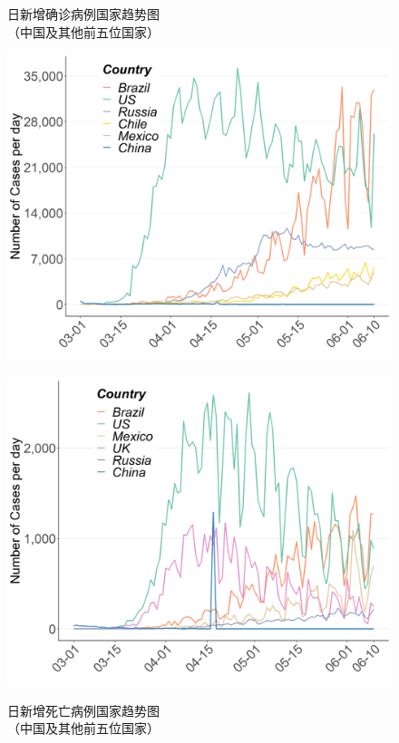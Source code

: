 \documentclass[
]{article}
\begin{document}
\begin{figure}[H]
\centering
\begin{minipage}[b]{0.48\linewidth}
\caption{日新增确诊病例国家趋势图\\（中国及其他前五位国家）}
\includegraphics[]{./input/covid2.png}
\label{}
\end{minipage}
\quad
\begin{minipage}[b]{0.48\linewidth}
\caption{日新增死亡病例国家趋势图\\（中国及其他前五位国家） }
\includegraphics[]{./input/covid3.png}
\label{}
\end{minipage}
\end{figure}
\end{document}
